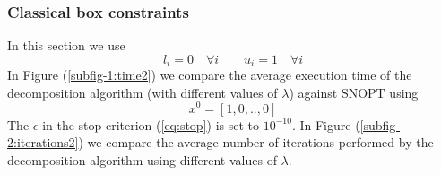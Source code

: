 \subsubsection{Classical box constraints}
In this section we use 
\begin{equation}\label{eq:classicalbox}
l_i = 0 \quad \forall i \qquad u_i = 1  \quad \forall i
\end{equation} 
In Figure (\ref{subfig-1:time2}) we compare the average execution time of the decomposition algorithm (with different values of $\lambda$) against SNOPT using 
\begin{equation}
x^0 = \left[1, 0, .., 0 \right]
\end{equation}
The $\epsilon$ in the stop criterion (\ref{eq:stop}) is set to $10^{-10}$. In Figure (\ref{subfig-2:iterations2}) we compare the average number of iterations performed by the decomposition algorithm using different values of $\lambda$.

